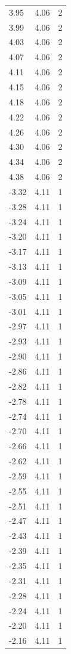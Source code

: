 \begin{longtable}{lrr}
  3.95 & 4.06 & 2 \\
  3.99 & 4.06 & 2 \\
  4.03 & 4.06 & 2 \\
  4.07 & 4.06 & 2 \\
  4.11 & 4.06 & 2 \\
  4.15 & 4.06 & 2 \\
  4.18 & 4.06 & 2 \\
  4.22 & 4.06 & 2 \\
  4.26 & 4.06 & 2 \\
  4.30 & 4.06 & 2 \\
  4.34 & 4.06 & 2 \\
  4.38 & 4.06 & 2 \\
  -3.32 & 4.11 & 1 \\
  -3.28 & 4.11 & 1 \\
  -3.24 & 4.11 & 1 \\
  -3.20 & 4.11 & 1 \\
  -3.17 & 4.11 & 1 \\
  -3.13 & 4.11 & 1 \\
  -3.09 & 4.11 & 1 \\
  -3.05 & 4.11 & 1 \\
  -3.01 & 4.11 & 1 \\
  -2.97 & 4.11 & 1 \\
  -2.93 & 4.11 & 1 \\
  -2.90 & 4.11 & 1 \\
  -2.86 & 4.11 & 1 \\
  -2.82 & 4.11 & 1 \\
  -2.78 & 4.11 & 1 \\
  -2.74 & 4.11 & 1 \\
  -2.70 & 4.11 & 1 \\
  -2.66 & 4.11 & 1 \\
  -2.62 & 4.11 & 1 \\
  -2.59 & 4.11 & 1 \\
  -2.55 & 4.11 & 1 \\
  -2.51 & 4.11 & 1 \\
  -2.47 & 4.11 & 1 \\
  -2.43 & 4.11 & 1 \\
  -2.39 & 4.11 & 1 \\
  -2.35 & 4.11 & 1 \\
  -2.31 & 4.11 & 1 \\
  -2.28 & 4.11 & 1 \\
  -2.24 & 4.11 & 1 \\
  -2.20 & 4.11 & 1 \\
  -2.16 & 4.11 & 1 \\

\end{longtable}
